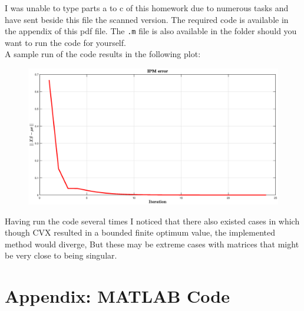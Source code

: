 \documentclass[a4paper]{article}
\begin{document}
\begin{center}
\end{center}

\thispagestyle{empty}
\newpage
\begin{Large}
	I was unable to type parts a to c of this homework due to numerous tasks and have sent beside this file the scanned version.
The required code is available in the appendix of this pdf file. The \texttt{.m} file is also available in the folder should you want to run the code for yourself.\\
A sample run of the code results in the following plot:
\begin{figure}[h!]
	\begin{center}
		\includegraphics[scale=.45]{error}
	\end{center}
\end{figure}
Having run the code several times I noticed that there also existed cases in which though CVX resulted in a bounded finite optimum value, the implemented method would diverge, But these may be extreme cases with matrices that might be very close to being singular.
\end{Large}
\section*{Appendix: MATLAB Code}

\end{document}
